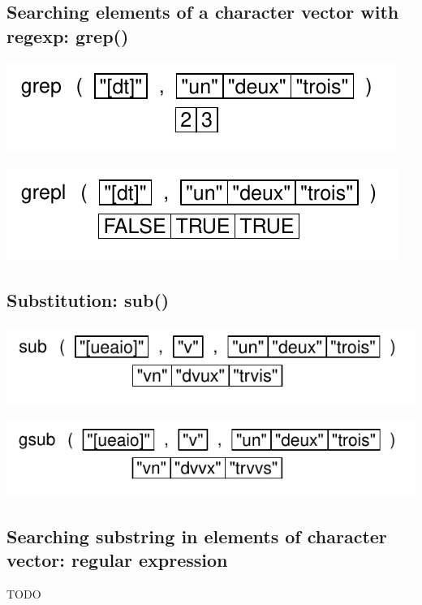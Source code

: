 \documentclass[pdflatex]{article}
\begin{document}
\subsection{Searching elements of a character vector with regexp: grep()}

\includegraphics{grep}

\includegraphics{grepl}

\subsection{Substitution: sub()}

\includegraphics{sub}

\includegraphics{gsub}

\subsection{Searching substring in elements of character vector: regular expression}

TODO


%
% 
\end{document}
